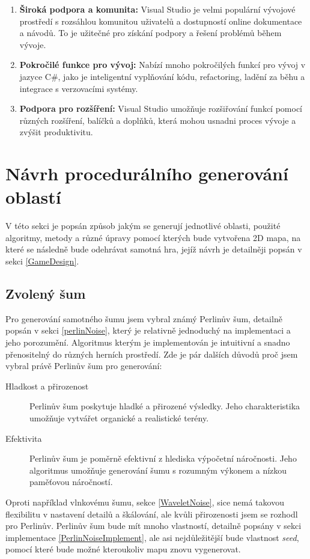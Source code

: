 \begin{enumerate}
	\item \textbf{Široká podpora a komunita:} Visual Studio je velmi populární vývojové prostředí s rozsáhlou komunitou uživatelů a dostupností online dokumentace a návodů. To je užitečné pro získání podpory a řešení problémů během vývoje.
	\item \textbf{Pokročilé funkce pro vývoj:} Nabízí mnoho pokročilých funkcí pro vývoj v jazyce C\#, jako je inteligentní vyplňování kódu, refactoring, ladění za běhu a integrace s verzovacími systémy. 
	\item \textbf{Podpora pro rozšíření:} Visual Studio umožňuje rozšiřování funkcí pomocí různých rozšíření, balíčků a doplňků, která mohou usnadni proces vývoje a zvýšit produktivitu.
\end{enumerate}

\section{Návrh procedurálního generování oblastí}
V této sekci je popsán způsob jakým se generují jednotlivé oblasti, použité algoritmy, metody a různé úpravy pomocí kterých bude vytvořena 2D mapa, na které se následně bude odehrávat samotná hra, jejíž návrh je detailněji popsán v sekci \ref{GameDesign}.

\subsection{Zvolený šum}
Pro generování samotného šumu jsem vybral známý Perlinův šum, detailně popsán v sekci \ref{perlinNoise}, který je relativně jednoduchý na implementaci a jeho porozumění. Algoritmus kterým je implementován je intuitivní a snadno přenositelný do různých herních prostředí. Zde je pár dalších důvodů proč jsem vybral právě Perlinův šum pro generování:

\begin{description}
	\item[Hladkost a přirozenost] Perlinův šum poskytuje hladké a přirozené výsledky. Jeho charakteristika umožňuje vytvářet organické a realistické terény.
	\item[Efektivita] Perlinův šum je poměrně efektivní z hlediska výpočetní náročnosti. Jeho algoritmus umožňuje generování šumu s rozumným výkonem a nízkou paměťovou náročností.
\end{description}

Oproti například vlnkovému šumu, sekce \ref{WaveletNoise}, sice nemá takovou flexibilitu v nastavení detailů a škálování, ale kvůli přirozenosti jsem se rozhodl pro Perlinův. Perlinův šum bude mít mnoho vlastností, detailně popsány v sekci implementace \ref{PerlinNoiseImplement}, ale asi nejdůležitější bude vlastnost \textit{seed}, pomocí které bude možné kteroukoliv mapu znovu vygenerovat.


